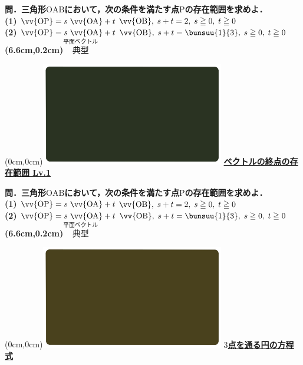 \documentclass[10pt,
fleqn,
dvipdfmx,
uplatex
]{jsarticle}
\begin{document}
\normalsize 
\bf\boldmath 問．三角形$\text{OAB}$において，次の条件を満たす点$\text{P}$の存在範囲を求めよ．\\
(1) $\vv{\text{OP}} =s$$\vv{\text{OA}} +t$$\vv{\text{OB}} ,\;s+t=2,\;s\geqq 0,\;t\geqq 0$\\
(2) $\vv{\text{OP}} =s$$\vv{\text{OA}} +t$$\vv{\text{OB}} ,\;s+t=\bunsuu{1}{3},\;s\geqq 0,\;t\geqq 0$\\

\at(6.6cm,0.2cm){\small\color{bradorange}$\overset{\text{平面ベクトル}}{\text{典型}}$}


\newpage



\at(0cm,0cm){\includegraphics[width=8cm,bb=0 0 1920 1080]{./youtube/thumbnails/templates/smart_background/平面ベクトル.jpeg}}
{\color{orange}\bf\boldmath\large\underline{ベクトルの終点の存在範囲 Lv.1 }}\vspace{0.3zw}

\normalsize 
\bf\boldmath 問．三角形$\text{OAB}$において，次の条件を満たす点$\text{P}$の存在範囲を求めよ．\\
(1) $\vv{\text{OP}} =s$$\vv{\text{OA}} +t$$\vv{\text{OB}} ,\;s+t=2,\;s\geqq 0,\;t\geqq 0$\\
(2) $\vv{\text{OP}} =s$$\vv{\text{OA}} +t$$\vv{\text{OB}} ,\;s+t=\bunsuu{1}{3},\;s\geqq 0,\;t\geqq 0$\\

\at(6.6cm,0.2cm){\small\color{bradorange}$\overset{\text{平面ベクトル}}{\text{典型}}$}


\newpage

\at(0cm,0cm){\includegraphics[width=8cm,bb=0 0 1920 1080]{./youtube/thumbnails/templates/smart_background/図形と方程式.jpeg}}
{\color{orange}\bf\boldmath\LARGE\underline{$3$点を通る円の方程式}}\vspace{0.3zw}
\end{document}
